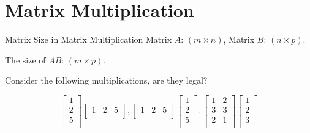\documentclass{beamer}
\begin{document}
\section{Matrix Multiplication}
\begin{frame}{Matrix Size in Matrix Multiplication}
Matrix $A$: $(m \times n)$, Matrix $B$: $(n \times p)$.

\vspace{3pt}
The size of $AB$: $(m \times p)$.

\vspace{3pt}
Consider the following multiplications, are they legal?

\begin{equation*}
    \left[ \begin{array}{c}
        1\\
        2\\
        5\\
    \end{array} \right] \left[ \begin{matrix}
        1&		2&		5\\
    \end{matrix} \right] , \left[ \begin{matrix}
        1&		2&		5\\
    \end{matrix} \right] \left[ \begin{array}{c}
        1\\
        2\\
        5\\
    \end{array} \right] , \left[ \begin{matrix}
        1&		2\\
        3&		3\\
        2&		1\\
    \end{matrix} \right] \left[ \begin{array}{c}
        1\\
        2\\
        3\\
    \end{array} \right]
\end{equation*}


\end{frame}
\end{document}

